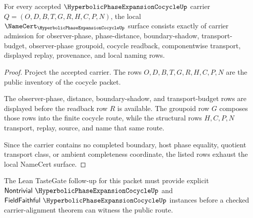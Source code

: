 \begin{theorem}
\label{thm:hyperbolic-phase-expansion-cocycle-namecert-obligations}
For every accepted $\HyperbolicPhaseExpansionCocycleUp$ carrier $Q=(O,D,B,T,G,R,H,C,P,N)$, the local $\NameCert_{\HyperbolicPhaseExpansionCocycleUp}$ surface consists exactly of carrier admission for observer-phase, phase-distance, boundary-shadow, transport-budget, observer-phase groupoid, cocycle readback, componentwise transport, displayed replay, provenance, and local naming rows.
\end{theorem}
\begin{proof}
Project the accepted carrier. The rows $O,D,B,T,G,R,H,C,P,N$ are the public inventory of the cocycle packet.

The observer-phase, distance, boundary-shadow, and transport-budget rows are displayed before the readback row $R$ is available. The groupoid row $G$ composes those rows into the finite cocycle route, while the structural rows $H,C,P,N$ transport, replay, source, and name that same route.

Since the carrier contains no completed boundary, host phase equality, quotient transport class, or ambient completeness coordinate, the listed rows exhaust the local NameCert surface.
\end{proof}



The Lean TasteGate follow-up for this packet must provide explicit $\mathsf{Nontrivial}\ \HyperbolicPhaseExpansionCocycleUp$ and $\mathsf{FieldFaithful}\ \HyperbolicPhaseExpansionCocycleUp$ instances before a checked carrier-alignment theorem can witness the public route.

